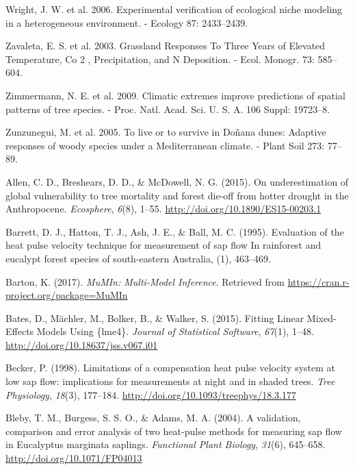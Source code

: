 \documentclass[11pt,twoside]{reedthesis}
\begin{document}
Wright, J. W. et al. 2006. Experimental verification of ecological niche
modeling in a heterogeneous environment. - Ecology 87: 2433--2439.\par
Zavaleta, E. S. et al. 2003. Grassland Responses To Three Years of
Elevated Temperature, Co 2 , Precipitation, and N Deposition. - Ecol.
Monogr. 73: 585--604.\par
Zimmermann, N. E. et al. 2009. Climatic extremes improve predictions of
spatial patterns of tree species. - Proc. Natl. Acad. Sci. U. S. A. 106
Suppl: 19723--8.\par
Zunzunegui, M. et al. 2005. To live or to survive in Doñana dunes:
Adaptive responses of woody species under a Mediterranean climate. -
Plant Soil 273: 77--89.\par

\hypertarget{refs}{}
\hypertarget{ref-Allen2015}{}
Allen, C. D., Breshears, D. D., \& McDowell, N. G. (2015). On
underestimation of global vulnerability to tree mortality and forest
die-off from hotter drought in the Anthropocene. \emph{Ecosphere},
\emph{6}(8), 1--55. \url{http://doi.org/10.1890/ES15-00203.1}

\hypertarget{ref-Barrett1995}{}
Barrett, D. J., Hatton, T. J., Ash, J. E., \& Ball, M. C. (1995).
Evaluation of the heat pulse velocity technique for measurement of sap
flow In rainforest and eucalypt forest species of south-eastern
Australia, (1), 463--469.

\hypertarget{ref-Barton2017}{}
Barton, K. (2017). \emph{MuMIn: Multi-Model Inference}. Retrieved from
\url{https://cran.r-project.org/package=MuMIn}

\hypertarget{ref-Bates2015}{}
Bates, D., Mächler, M., Bolker, B., \& Walker, S. (2015). Fitting Linear
Mixed-Effects Models Using \{lme4\}. \emph{Journal of Statistical
Software}, \emph{67}(1), 1--48.
\url{http://doi.org/10.18637/jss.v067.i01}

\hypertarget{ref-Becker1998}{}
Becker, P. (1998). Limitations of a compensation heat pulse velocity
system at low sap flow: implications for measurements at night and in
shaded trees. \emph{Tree Physiology}, \emph{18}(3), 177--184.
\url{http://doi.org/10.1093/treephys/18.3.177}

\hypertarget{ref-Bleby2004}{}
Bleby, T. M., Burgess, S. S. O., \& Adams, M. A. (2004). A validation,
comparison and error analysis of two heat-pulse methods for measuring
sap flow in Eucalyptus marginata saplings. \emph{Functional Plant
Biology}, \emph{31}(6), 645--658. \url{http://doi.org/10.1071/FP04013}
\end{document}
